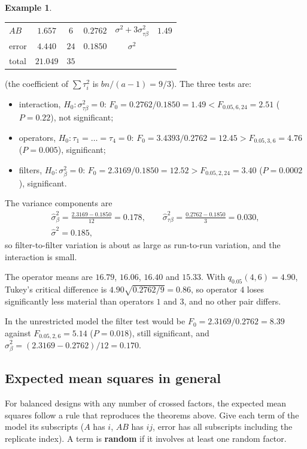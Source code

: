 \documentclass[11pt,a4paper]{article}
\numberwithin{equation}{section}
\theoremstyle{definition}
\newtheorem{exa}[thm]{Example}
\begin{document}
\begin{exa}
\begin{center}
\begin{tabular}{l|ccccc}
$AB$ & $1.657$ & $6$ & $0.2762$ & $\sigma^2 + 3\sigma^2_{\tau\beta}$ & $1.49$ \\
error & $4.440$ & $24$ & $0.1850$ & $\sigma^2$ & \\
\hline
total & $21.049$ & $35$ & & &
\end{tabular}
\end{center}
(the coefficient of $\sum\tau_i^2$ is $bn/(a - 1) = 9/3$). The three tests are:
\begin{itemize}
\item interaction, $H_0 : \sigma^2_{\tau\beta} = 0$: $F_0 = 0.2762/0.1850 = 1.49 < F_{0.05, 6, 24} = 2.51$ ($P = 0.22$), not significant;
\item operators, $H_0 : \tau_1 = \dots = \tau_4 = 0$: $F_0 = 3.4393/0.2762 = 12.45 > F_{0.05, 3, 6} = 4.76$ ($P = 0.005$), significant;
\item filters, $H_0 : \sigma^2_\beta = 0$: $F_0 = 2.3169/0.1850 = 12.52 > F_{0.05, 2, 24} = 3.40$ ($P = 0.0002$), significant.
\end{itemize}
The variance components are
\begin{gather*}
\hat\sigma^2_\beta = \frac{2.3169 - 0.1850}{12} = 0.178 , \qquad \hat\sigma^2_{\tau\beta} = \frac{0.2762 - 0.1850}3 = 0.030 , \\
\hat\sigma^2 = 0.185 ,
\end{gather*}
so filter-to-filter variation is about as large as run-to-run variation, and the interaction is small.

The operator means are $16.79$, $16.06$, $16.40$ and $15.33$. With $q_{0.05}(4, 6) = 4.90$, Tukey's critical difference is $4.90\sqrt{0.2762/9} = 0.86$, so operator $4$ loses
significantly less material than operators $1$ and $3$, and no other pair differs.

In the unrestricted model the filter test would be $F_0 = 2.3169/0.2762 = 8.39$ against $F_{0.05, 2, 6} = 5.14$ ($P = 0.018$), still significant, and $\hat\sigma^2_\beta = (2.3169 - 0.2762)/12 = 0.170$.
\end{exa}

\subsection{Expected mean squares in general}
For balanced designs with any number of crossed factors, the expected mean squares follow a rule that reproduces the theorems above. Give each term
of the model its subscripts ($A$ has $i$, $AB$ has $ij$, error has all subscripts including the replicate index). A term is \textbf{random} if it involves at
least one random factor.
\end{document}
